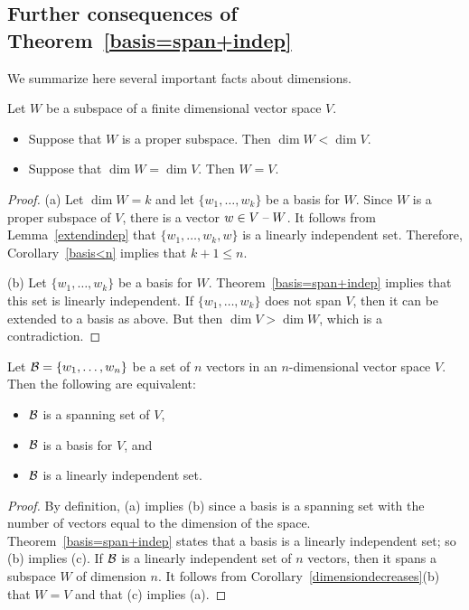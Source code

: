 \documentclass{ximera}
\begin{document}
\subsection*{Further consequences of Theorem~\ref{basis=span+indep}}

We summarize here several important facts about dimensions.

\begin{cor}  \label{dimensiondecreases}
Let $W$ be a subspace of a finite dimensional vector space $V$.
\begin{itemize}
\item[(a)]   Suppose that $W$ is a proper subspace.
Then $\dim W < \dim V$.
\item[(b)]   Suppose that $\dim W = \dim V$.  Then $W=V$.
\end{itemize}
\end{cor}

\begin{proof}
(a) Let $\dim W = k$ and let $\{w_1,\ldots,w_k\}$ be a basis for
$W$.  Since $W$ is a proper subspace of $V$, there is a vector
$w\in V\;\mbox{--}\; W$.  It follows from Lemma~\ref{extendindep} that
$\{w_1,\ldots,w_k,w\}$ is a linearly independent set.  Therefore,
Corollary~\ref{basis<n} implies that $k+1\le n$.

(b) Let $\{w_1,\ldots,w_k\}$ be a basis for $W$.
Theorem~\ref{basis=span+indep} implies that this set is linearly
independent.  If $\{w_1,\ldots,w_k\}$ does not span $V$, then it
can be extended to a basis as above.  But then $\dim V > \dim W$,
which is a contradiction.  \end{proof}

\begin{cor} \label{C:dim=n}
Let ${\cal B}=\{w_1,\ldots,w_n\}$ be a set of $n$ vectors in an
$n$-dimensional vector space $V$.  Then the following are equivalent:
\begin{itemize}
\item[(a)]  ${\cal B}$ is a spanning set of $V$, 
\item[(b)]  ${\cal B}$ is a basis for $V$, and 
\item[(c)] ${\cal B}$ is a linearly independent set.
\end{itemize}
\end{cor}

\begin{proof}    By definition, (a) implies (b) since a basis is a spanning
set with the number of vectors equal to the dimension of the space.
Theorem~\ref{basis=span+indep} states that a basis is a linearly
independent set; so (b) implies (c). If ${\cal B}$ is a linearly
independent set of $n$ vectors, then it spans a subspace $W$ of
dimension $n$.  It follows from Corollary~\ref{dimensiondecreases}(b)
that $W=V$ and that (c) implies (a).  \end{proof}
\end{document}
